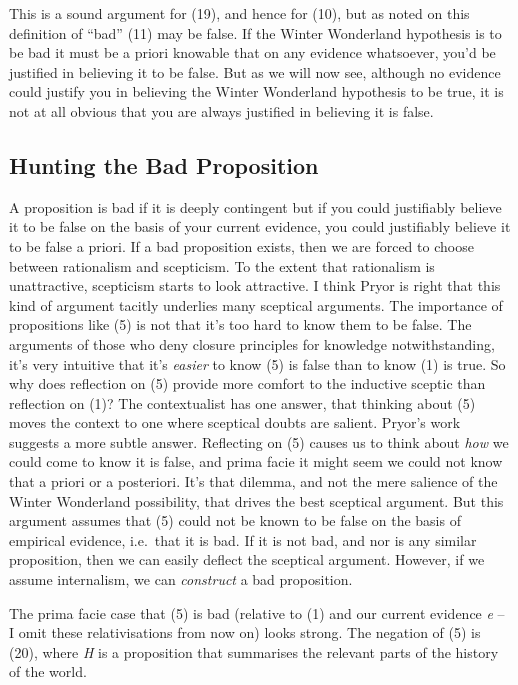 \documentclass[
  11pt,
  letterpaper,
  DIV=11,
  numbers=noendperiod,
  oneside]{scrartcl}
\begin{document}
This is a sound argument for (19), and hence for (10), but as noted on
this definition of ``bad'' (11) may be false. If the Winter Wonderland
hypothesis is to be bad it must be a priori knowable that on any
evidence whatsoever, you'd be justified in believing it to be false. But
as we will now see, although no evidence could justify you in believing
the Winter Wonderland hypothesis to be true, it is not at all obvious
that you are always justified in believing it is false.

\subsection{Hunting the Bad
Proposition}\label{hunting-the-bad-proposition}

A proposition is bad if it is deeply contingent but if you could
justifiably believe it to be false on the basis of your current
evidence, you could justifiably believe it to be false a priori. If a
bad proposition exists, then we are forced to choose between rationalism
and scepticism. To the extent that rationalism is unattractive,
scepticism starts to look attractive. I think Pryor is right that this
kind of argument tacitly underlies many sceptical arguments. The
importance of propositions like (5) is not that it's too hard to know
them to be false. The arguments of those who deny closure principles for
knowledge notwithstanding, it's very intuitive that it's \emph{easier}
to know (5) is false than to know (1) is true. So why does reflection on
(5) provide more comfort to the inductive sceptic than reflection on
(1)? The contextualist has one answer, that thinking about (5) moves the
context to one where sceptical doubts are salient. Pryor's work suggests
a more subtle answer. Reflecting on (5) causes us to think about
\emph{how} we could come to know it is false, and prima facie it might
seem we could not know that a priori or a posteriori. It's that dilemma,
and not the mere salience of the Winter Wonderland possibility, that
drives the best sceptical argument. But this argument assumes that (5)
could not be known to be false on the basis of empirical evidence,
i.e.~that it is bad. If it is not bad, and nor is any similar
proposition, then we can easily deflect the sceptical argument. However,
if we assume internalism, we can \emph{construct} a bad proposition.

The prima facie case that (5) is bad (relative to (1) and our current
evidence \emph{e} -- I omit these relativisations from now on) looks
strong. The negation of (5) is (20), where \emph{H} is a proposition
that summarises the relevant parts of the history of the
world.
\end{document}
